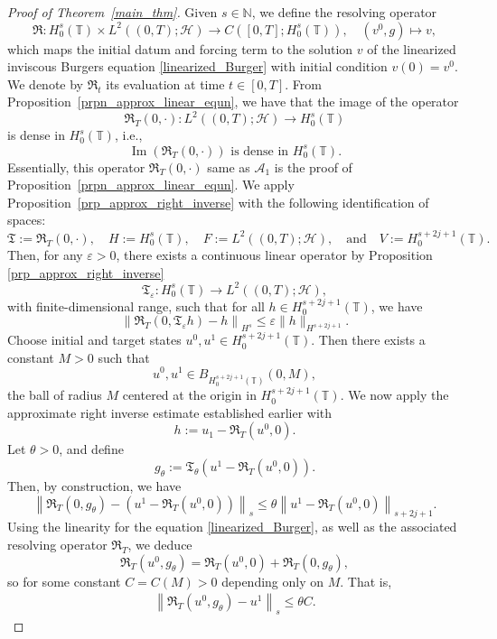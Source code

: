 \documentclass[10pt, reqno]{amsart}
\numberwithin{equation}{section}
\begin{document}
\begin{proof}[Proof of Theorem~\ref{main_thm}]
Given \( s \in \mathbb{N} \), we define the resolving operator
	\[
	\mathfrak{R} : H^{s}_0(\mathbb{T}) \times L^2((0, T); \mathcal{H}) \to C([0, T]; H^{s}_0(\mathbb{T})), \quad (v^0, g) \mapsto v,
	\]  
	which maps the initial datum and forcing term to the solution \( v \) of the linearized inviscous Burgers equation \eqref{linearized_Burger} with initial condition \( v(0) = v^0 \). We denote by \( \mathfrak{R}_t \) its evaluation at time \( t \in [0, T] \). 
	From Proposition~\ref{prpn_approx_linear_equn}, we have that the image of the operator  
	\[
	\mathfrak{R}_T(0, \cdot) : L^2((0, T); \mathcal{H}) \to H^s_0(\mathbb{T})
	\]  
	is dense in \( H^s_0(\mathbb{T}) \), i.e.,  
	\[
	\operatorname{Im}\left( \mathfrak{R}_T(0, \cdot) \right) \text{ is dense in } H^s_0(\mathbb{T}).
	\] 
Essentially, this operator $\mathfrak{R}_T(0, \cdot)$ same as $\mathcal{A}_1$ is the proof of Proposition~\eqref{prpn_approx_linear_equn}. We apply Proposition~\ref{prp_approx_right_inverse} with the following identification of spaces:
	\[
	\mathfrak{T} := \mathfrak{R}_T(0, \cdot), \quad H := H^s_0(\mathbb{T}), \quad F := L^2((0, T); \mathcal{H}), \quad \text{and} \quad V := H^{s + 2j + 1}_0(\mathbb{T}).
	\]  
	Then, for any \( \varepsilon > 0 \), there exists a continuous linear operator by Proposition \ref{prp_approx_right_inverse}
	\[
	\mathfrak{T}_{\varepsilon} : H^s_0(\mathbb{T}) \to L^2((0, T); \mathcal{H}),
	\]  
	with finite-dimensional range, such that for all \( h \in H^{s + 2j + 1}_0(\mathbb{T}) \), we have  
	\[
	\left\| \mathfrak{R}_T(0,  \mathfrak{T}_\varepsilon h) - h \right\|_{H^s} \leq \varepsilon \| h \|_{H^{s + 2j + 1}}.
	\]  
	Choose initial and target states \( u^0, u^1 \in H^{s + 2j + 1}_0(\mathbb{T}) \). Then there exists a constant \( M > 0 \) such that  
	\[
	u^0, u^1 \in B_{H^{s + 2j + 1}_0(\mathbb{T})}(0, M),
	\]  
	the ball of radius \( M \) centered at the origin in \( H^{s + 2j + 1}_0(\mathbb{T}) \).  
	We now apply the approximate right inverse estimate established earlier with  
	\[
	h := u_1 - \mathfrak{R}_T(u^0, 0).
	\]  
	Let \( \theta > 0 \), and define
	\[
	g_\theta :=  \mathfrak{T}_\theta\left( u^1 - \mathfrak{R}_T(u^0, 0) \right).
	\]  
	Then, by construction, we have  
	\[
	\left\| \mathfrak{R}_T(0, g_\theta) - \left( u^1 - \mathfrak{R}_T(u^0, 0) \right) \right\|_{s} \leq \theta \left\| u^1 - \mathfrak{R}_T(u^0, 0) \right\|_{{s + 2j + 1}}.
	\]  
	Using the linearity for the equation \eqref{linearized_Burger}, as well as the associated resolving operator \( \mathfrak{R}_T \), we deduce  
	\[
	\mathfrak{R}_T(u^0, g_\theta) = \mathfrak{R}_T(u^0, 0) + \mathfrak{R}_T(0, g_\theta),
	\]  
	so for some constant \( C = C(M) > 0 \) depending only on \( M \). That is,  
	\begin{align} \label{ineq_1}
		\left\| \mathfrak{R}_T(u^0, g_\theta) - u^1 \right\|_{s} \leq \theta C.
	\end{align}  


\end{proof}
\end{document}
